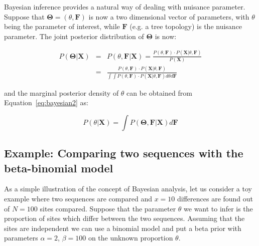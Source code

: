 Bayesian inference provides a natural way of dealing with nuisance parameter.
Suppose that $\mathbf{\Theta}=\left(\theta,\mathbf{F}\right)$ is now a two dimensional vector of parameters, with $\theta$ being the parameter of interest, while 
$\mathbf{F}$ (e.g. a tree topology) is the nuisance parameter.
The joint posterior distribution of $\mathbf{\Theta}$ is now:

\begin{eqnarray}
P\left(\mathbf{\Theta}|\mathbf{X}\right) &=& P\left(\theta,\mathbf{F}|\mathbf{X}\right)=\frac{P\left(\theta,\mathbf{F}\right)\cdot P\left(\mathbf{X}|\theta,\mathbf{F}\right)}{P\left(\mathbf{X}\right)} \\ \nonumber
&=& \frac{P\left(\theta,\mathbf{F}\right)\cdot P\left(\mathbf{X}|\theta,\mathbf{F}\right)}{\int\int P(\theta,\mathbf{F})\cdot P\left(\mathbf{X}|\theta,\mathbf{F}\right)d\theta d\mathbf{F}}
\label{eq:bayesian2}
\end{eqnarray}

\noindent
and the marginal posterior density of $\theta$ can be obtained from Equation~\ref{eq:bayesian2} as:

\begin{equation}
P\left(\theta|\mathbf{X}\right) =\int P\left(\mathbf{\Theta},\mathbf{F}|\mathbf{X}\right)d\mathbf{F}
\label{eq:bayesian3}
\end{equation}

\subsection{Example: Comparing two sequences with the beta-binomial model}

As a simple illustration of the concept of Bayesian analysis, let us consider a toy example where two sequences are compared and $x=10$ differences are found out of $N=100$ sites compared.
Suppose that the parameter $\theta$ we want to infer is the proportion of sites which differ between the two sequences.
Assuming that the sites are independent we can use a binomial model and put a beta prior with parameters $\alpha=2$, $\beta=100$ on the unknown proportion $\theta$. %



